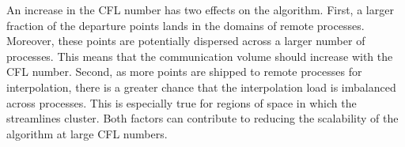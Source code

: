 An increase in the CFL number has two effects on the algorithm. First, a larger fraction of the departure points lands in the domains of remote processes. Moreover, these points are potentially dispersed across a larger number of processes. This means that the communication volume should increase with the CFL number. Second, as more points are shipped to remote processes for interpolation, there is a greater chance that the interpolation load is imbalanced across processes. This is especially true for regions of space in which the streamlines cluster. Both factors can contribute to reducing the scalability of the algorithm at large CFL numbers. 
\begin{figure}[htbp]
	\begin{center}
		\\

\end{center}
\end{figure}
